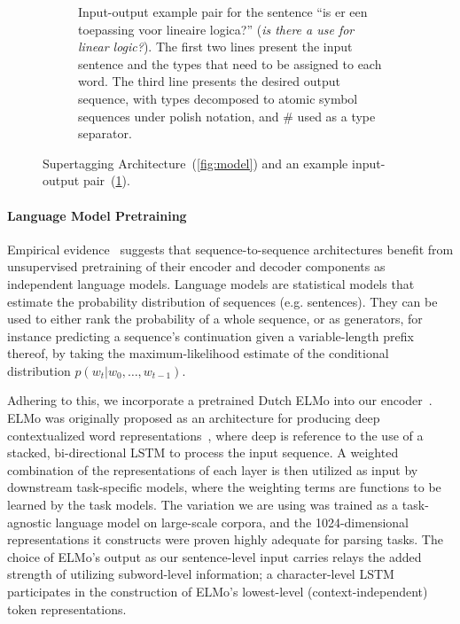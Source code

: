 \begin{figure}
\begin{subfigure}[b]{1\textwidth}
\begin{minipage}{1\textwidth}
\end{minipage}
\caption{Input-output example pair for the sentence ``is er een toepassing voor lineaire logica?'' (\textit{is there a use for linear logic?}). The first two lines present the input sentence and the types that need to be assigned to each word. The third line presents the desired output sequence, with types decomposed to atomic symbol sequences under polish notation, and \# used as a type separator.}
\label{fig:io}
\end{subfigure}
\caption[Supertagging Architecture and I/O Pair]{Supertagging Architecture~(\ref{fig:model}) and an example input-output pair~(\ref{fig:io}).}
\label{fig:modelandio}
\end{figure}

\paragraph{Language Model Pretraining}
Empirical evidence~\cite{D17-1039} suggests that sequence-to-sequence architectures benefit from unsupervised pretraining of their encoder and decoder components as independent language models.
Language models are statistical models that estimate the probability distribution of sequences (e.g. sentences).
They can be used to either rank the probability of a whole sequence, or as generators, for instance predicting a sequence's continuation given a variable-length prefix thereof, by taking the maximum-likelihood estimate of the conditional distribution $
p(w_t | w_{0},\dots,w_{t-1})
$.

Adhering to this, we incorporate a pretrained Dutch ELMo into our encoder~\cite{dutch_elmo}.
ELMo was originally proposed as an architecture for producing deep contextualized word representations~\cite{peters2018deep}, where deep is reference to the use of a stacked, bi-directional LSTM to process the input sequence. 
A weighted combination of the representations of each layer is then utilized as input by downstream task-specific models, where the weighting terms are functions to be learned by the task models.
The variation we are using was trained as a task-agnostic language model on large-scale corpora, and the 1024-dimensional representations it constructs were proven highly adequate for parsing tasks.
The choice of ELMo's output as our sentence-level input carries relays the added strength of utilizing subword-level information; a character-level LSTM participates in the construction of ELMo's lowest-level (context-independent) token representations.

